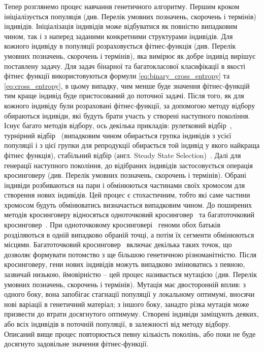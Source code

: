 Тепер розглянемо процес навчання генетичного алгоритму. Першим кроком ініціалізується популяція (див. Перелік умовних позначень, скорочень і термінів) індивідів. Ініціалізація індивідів може відбуватися як повністю випадковим чином, так і з наперед заданими конкретними структурами індивідів. Для кожного індивіду в популяції розраховується фітнес-функція (див. Перелік умовних позначень, скорочень і термінів), яка вимірює як добре індивід вирішує поставлену задачу. Для задач бінарної та багатокласової класифікації в якості фітнес функції використовуються формули \ref{eq:binary_cross_entropy} та \ref{eq:cross_entropy}, в цьому випадку, чим менше буде значення фітнес-функцій тим краще індивід буде пристосований до поточної задачі. Після того, як для кожного індивіду були розраховані фітнес-функції, за допомогою методу відбору обираються індивіди, які будуть брати участь у створені наступного покоління. Існує багато методів відбору, ось декілька прикладів: рулетковий відбір~\cite{ct2}, турнірний відбір~\cite{ct3} (випадковим чином обирається групка індивідів з усієї популяції і з цієї групки для репродукції обирається той індивід у якого найкраща фітнес функція), стабільний відбір (англ. Steady State Selection)~\cite{ct5}. Далі для генерації наступного покоління, до відібраних індивідів застосовується операція кросинговеру (див. Перелік умовних позначень, скорочень і термінів). Обрані індивіди розбиваються на пари і обмінюються частинами своїх хромосом для створення нових індивідів. Цей процес є стохастичним, тобто які саме частини хромосом будуть обмінюватись визначається випадковим чином. До поширених методів кросинговеру відносяться одноточковий кросинговер~\cite{ct10} та багатоточковий кросинговер~\cite{ct11}. При одноточковому кросинговері~\cite{ct10} геноми обох батьків розділяються в одній випадково обраній точці, а потім їх сегменти обмінюються місцями. Багатоточковий кросинговер~\cite{ct11} включає декілька таких точок, що дозволяє формувати потомство з ще більшою генетичною різноманітністю. Після кросинговеру, гени нових індивідів можуть випадково змінюватись з певною, зазвичай низькою, ймовірністю -- цей процес називається мутацією (див. Перелік умовних позначень, скорочень і термінів). Мутація має двосторонній вплив: з одного боку, вона запобігає стагнації популяції у локальному оптимумі, вносячи нові варіації в генетичний матеріал; з іншого боку, занадто різка мутація може призвести до втрати досягнутого оптимуму. Створені індивіди заміщують деяких, або всіх індивідів в поточній популяції, в залежності від методу відбору. Описаний вище процес повторюється певну кількість поколінь, або поки не буде досягнуто задовільне значення фітнес-функції.

